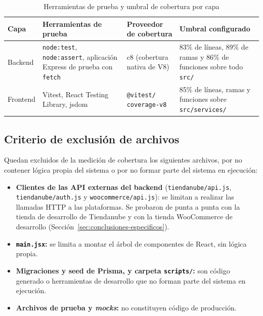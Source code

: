 \begin{table}[h]
\centering
\caption{Herramientas de prueba y umbral de cobertura por capa}
\label{tab:herramientas-prueba}
\renewcommand{\arraystretch}{1.3}
\begin{tabular}{|m{2.1cm}|m{4.3cm}|m{3.4cm}|m{4.8cm}|}
\hline
\textbf{Capa} & \textbf{Herramientas de prueba} & \textbf{Proveedor de cobertura} & \textbf{Umbral configurado} \\
\hline
Backend & \texttt{node:test}, \texttt{node:assert}, aplicación Express de prueba con \texttt{fetch} & c8 (cobertura nativa de V8) & 83\% de líneas, 89\% de ramas y 86\% de funciones sobre todo \texttt{src/} \\
\hline
Frontend & Vitest, React Testing Library, jsdom & \texttt{@vitest/} \texttt{coverage-v8} & 85\% de líneas, ramas y funciones sobre \texttt{src/services/} \\
\hline
\end{tabular}
\end{table}

\subsection{Criterio de exclusión de archivos}
\label{sec:exclusion-cobertura}

Quedan excluidos de la medición de cobertura los siguientes archivos, por no contener lógica propia del sistema o por no formar parte del sistema en ejecución:

\begin{itemize}
    \item \textbf{Clientes de las API externas del backend} (\texttt{tiendanube/api.js}, \texttt{tiendanube/auth.js} y \texttt{woocommerce/api.js}): se limitan a realizar las llamadas HTTP a las plataformas. Se probaron de punta a punta con la tienda de desarrollo de Tiendanube y con la tienda WooCommerce de desarrollo (Sección~\ref{sec:conclusiones-especificos}).
    \item \textbf{\texttt{main.jsx}:} se limita a montar el árbol de componentes de React, sin lógica propia.
    \item \textbf{Migraciones y seed de Prisma, y carpeta \texttt{scripts/}:} son código generado o herramientas de desarrollo que no forman parte del sistema en ejecución.
    \item \textbf{Archivos de prueba y \emph{mocks}:} no constituyen código de producción.
\end{itemize}

